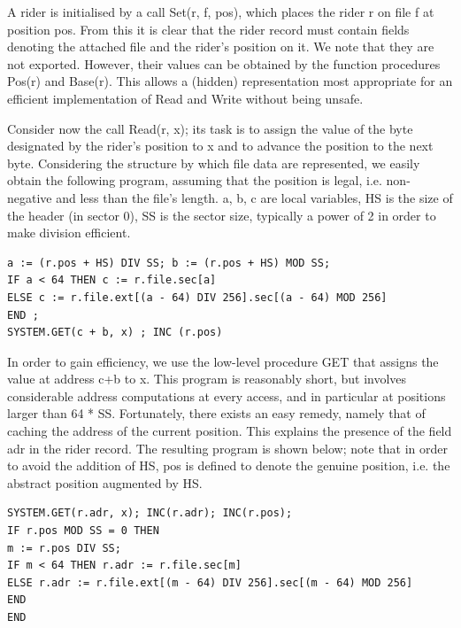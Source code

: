 A rider is initialised by a call Set(r, f, pos), which places the rider r on file f at position pos. From
this it is clear that the rider record must contain fields denoting the attached file and the rider's
position on it. We note that they are not exported. However, their values can be obtained by the
function procedures Pos(r) and Base(r). This allows a (hidden) representation most appropriate
for an efficient implementation of Read and Write without being unsafe.

Consider now the call Read(r, x); its task is to assign the value of the byte designated by the
rider's position to x and to advance the position to the next byte. Considering the structure by
which file data are represented, we easily obtain the following program, assuming that the
position is legal, i.e. non-negative and less than the file's length. a, b, c are local variables, HS is
the size of the header (in sector 0), SS is the sector size, typically a power of 2 in order to make
division efficient.
\begin{verbatim}
a := (r.pos + HS) DIV SS; b := (r.pos + HS) MOD SS;
IF a < 64 THEN c := r.file.sec[a]
ELSE c := r.file.ext[(a - 64) DIV 256].sec[(a - 64) MOD 256]
END ;
SYSTEM.GET(c + b, x) ; INC (r.pos)
\end{verbatim}

In order to gain efficiency, we use the low-level procedure GET that assigns the value at address
c+b to x. This program is reasonably short, but involves considerable address computations at
every access, and in particular at positions larger than 64 * SS. Fortunately, there exists an easy
remedy, namely that of caching the address of the current position. This explains the presence of
the field adr in the rider record. The resulting program is shown below; note that in order to avoid
the addition of HS, pos is defined to denote the genuine position, i.e. the abstract position
augmented by HS.
\begin{verbatim}
SYSTEM.GET(r.adr, x); INC(r.adr); INC(r.pos);
IF r.pos MOD SS = 0 THEN
m := r.pos DIV SS;
IF m < 64 THEN r.adr := r.file.sec[m]
ELSE r.adr := r.file.ext[(m - 64) DIV 256].sec[(m - 64) MOD 256]
END
END
\end{verbatim}

